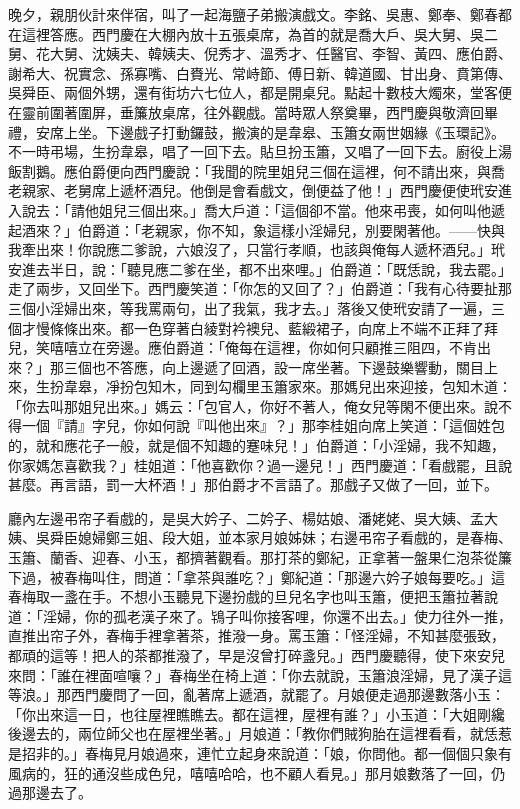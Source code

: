 晚夕，親朋伙計來伴宿，叫了一起海鹽子弟搬演戲文。李銘、吳惠、鄭奉、鄭春都在這裡答應。西門慶在大棚內放十五張桌席，為首的就是喬大戶、吳大舅、吳二舅、花大舅、沈姨夫、韓姨夫、倪秀才、溫秀才、任醫官、李智、黃四、應伯爵、謝希大、祝實念、孫寡嘴、白賚光、常峙節、傅日新、韓道國、甘出身、賁第傳、吳舜臣、兩個外甥，還有街坊六七位人，都是開桌兒。點起十數枝大燭來，堂客便在靈前圍著圍屏，垂簾放桌席，往外觀戲。當時眾人祭奠畢，西門慶與敬濟回畢禮，安席上坐。下邊戲子打動鑼鼓，搬演的是韋皋、玉簫女兩世姻緣《玉環記》。不一時弔場，生扮韋皋，唱了一回下去。貼旦扮玉簫，又唱了一回下去。廚役上湯飯割鵝。應伯爵便向西門慶說：「我聞的院里姐兒三個在這裡，何不請出來，與喬老親家、老舅席上遞杯酒兒。他倒是會看戲文，倒便益了他！」西門慶便使玳安進入說去：「請他姐兒三個出來。」喬大戶道：「這個卻不當。他來弔喪，如何叫他遞起酒來？」伯爵道：「老親家，你不知，象這樣小淫婦兒，別要閑著他。——快與我牽出來！你說應二爹說，六娘沒了，只當行孝順，也該與俺每人遞杯酒兒。」玳安進去半日，說：「聽見應二爹在坐，都不出來哩。」伯爵道：「既恁說，我去罷。」走了兩步，又回坐下。西門慶笑道：「你怎的又回了？」伯爵道：「我有心待要扯那三個小淫婦出來，等我罵兩句，出了我氣，我才去。」落後又使玳安請了一遍，三個才慢條條出來。都一色穿著白綾對衿襖兒、藍緞裙子，向席上不端不正拜了拜兒，笑嘻嘻立在旁邊。應伯爵道：「俺每在這裡，你如何只顧推三阻四，不肯出來？」那三個也不答應，向上邊遞了回酒，設一席坐著。下邊鼓樂響動，關目上來，生扮韋皋，凈扮包知木，同到勾欄里玉簫家來。那媽兒出來迎接，包知木道：「你去叫那姐兒出來。」媽云：「包官人，你好不著人，俺女兒等閑不便出來。說不得一個『請』字兒，你如何說『叫他出來』？」那李桂姐向席上笑道：「這個姓包的，就和應花子一般，就是個不知趣的蹇味兒！」伯爵道：「小淫婦，我不知趣，你家媽怎喜歡我？」桂姐道：「他喜歡你？過一邊兒！」西門慶道：「看戲罷，且說甚麼。再言語，罰一大杯酒！」那伯爵才不言語了。那戲子又做了一回，並下。

廳內左邊弔帘子看戲的，是吳大妗子、二妗子、楊姑娘、潘姥姥、吳大姨、孟大姨、吳舜臣媳婦鄭三姐、段大姐，並本家月娘姊妹；右邊弔帘子看戲的，是春梅、玉簫、蘭香、迎春、小玉，都擠著觀看。那打茶的鄭紀，正拿著一盤果仁泡茶從簾下過，被春梅叫住，問道：「拿茶與誰吃？」鄭紀道：「那邊六妗子娘每要吃。」這春梅取一盞在手。不想小玉聽見下邊扮戲的旦兒名字也叫玉簫，便把玉簫拉著說道：「淫婦，你的孤老漢子來了。鴇子叫你接客哩，你還不出去。」使力往外一推，直推出帘子外，春梅手裡拿著茶，推潑一身。罵玉簫：「怪淫婦，不知甚麼張致，都頑的這等！把人的茶都推潑了，早是沒曾打碎盞兒。」西門慶聽得，使下來安兒來問：「誰在裡面喧嚷？」春梅坐在椅上道：「你去就說，玉簫浪淫婦，見了漢子這等浪。」那西門慶問了一回，亂著席上遞酒，就罷了。月娘便走過那邊數落小玉：「你出來這一日，也往屋裡瞧瞧去。都在這裡，屋裡有誰？」小玉道：「大姐剛纔後邊去的，兩位師父也在屋裡坐著。」月娘道：「教你們賊狗胎在這裡看看，就恁惹是招非的。」春梅見月娘過來，連忙立起身來說道：「娘，你問他。都一個個只象有風病的，狂的通沒些成色兒，嘻嘻哈哈，也不顧人看見。」那月娘數落了一回，仍過那邊去了。

